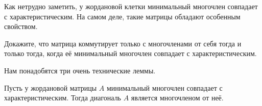 Как нетрудно заметить, у жордановой клетки минимальный многочлен совпадает с характеристическим. На самом деле, такие матрицы обладают особенным свойством.

\begin{problem}[А.\,А. Клячко]
    Докажите, что матрица коммутирует только с многочленами от себя тогда и только тогда, когда её минимальный многочлен совпадает с характеристическим.
\end{problem}

Нам понадобятся три очень технические леммы.

\begin{lemma}
    Пусть у жордановой матрицы $A$ минимальный многочлен совпадает с характеристическим. Тогда диагональ $A$ является многочленом от неё.
\end{lemma}

